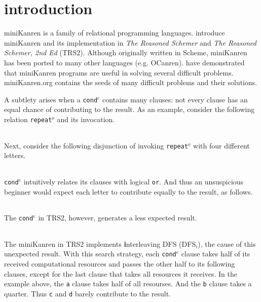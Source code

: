 \documentclass[format=acmlarge, review=true, authordraft=true]{acmart}
\newcommand{\conde}{\texttt{cond$^e$}}
\newcommand{\clisting}[1]{
\begin{center}
  \begin{tabular}{c}
	
    \end{tabular}
\end{center}
}
\newcommand{\repeato}{\texttt{repeat$^o$}}
\newcommand{\DFSi }[0]{DFS$_{i}$}
\begin{document}
\maketitle

\section{introduction}

miniKanren is a family of relational programming languages.
\citet{Friedman:2005:RS:1121583,friedman_reasoned_2018} introduce
miniKanren and its implementation in \emph{The Reasoned Schemer} 
and \emph{The Reasoned Schemer, 2nd Ed} (TRS2). Although originally written in 
Scheme, miniKanren has been ported to many other languages (e.g. 
OCanren\citep{kosarev2018typed}). \citet{byrd2017unified} have 
demonstrated that miniKanren programs are useful in solving several difficult
problems. miniKanren.org contains the seeds of many difficult problems and 
their solutions. 


A subtlety arises 
when a \conde{} contains many clauses: not every clause has an 
equal chance of contributing to the result. As an example, consider the 
following 
relation \repeato{} and its invocation. 

\clisting{Figures/repeato.rkt}

\noindent Next, consider the following disjunction of invoking \repeato{} with 
four 
different letters.

\clisting{Figures/example.rkt}

\noindent \conde{} intuitively relates its clauses with logical \texttt{or}. And 
thus an 
unsuspicious beginner would expect each letter to contribute equally to the 
result, as follows.

\clisting{Figures/run-repeato-fair.rkt}

\noindent The \conde{} in TRS2, however, generates a less expected result.

\clisting{Figures/run-repeato-idfs.rkt}

The miniKanren in TRS2 implements \textbf{i}nterleaving DFS (\DFSi), the cause of this 
unexpected result. With this search strategy, each \conde{} clause takes half 
of its received computational resources and passes the other half to its 
following clauses, except for the last clause that takes all resources it 
receives. In the example above, the \texttt{a} clause takes half of all 
resourses. And the \texttt{b} clause takes a quarter. Thus \texttt{c} and 
\texttt{d} barely contribute to the result.
\end{document}
